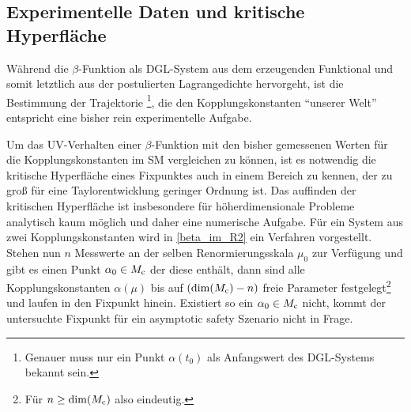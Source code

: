   \subsection{Experimentelle Daten und kritische Hyperfläche}
    Während die $\beta$-Funktion als DGL-System aus dem erzeugenden Funktional und somit letztlich 
    aus der postulierten Lagrangedichte hervorgeht, ist die Bestimmung der Trajektorie
    \footnote{Genauer muss nur ein Punkt $\alpha(t_0)$ als Anfangswert des DGL-Systems 
    bekannt sein.}, die 
    den Kopplungskonstanten "`unserer Welt"' entspricht eine bisher rein experimentelle Aufgabe. 
    
  
    Um das UV-Verhalten einer $\beta$-Funktion mit den bisher gemessenen Werten für die 
    Kopplungskonstanten im SM vergleichen zu können, ist es notwendig die kritische Hyperfläche 
    eines Fixpunktes auch in einem Bereich zu kennen, der zu groß für eine Taylorentwicklung 
    geringer Ordnung ist. Das auffinden der kritischen Hyperfläche ist insbesondere für 
    höherdimensionale Probleme analytisch kaum möglich und daher eine numerische Aufgabe. Für 
    ein System aus zwei Kopplungskonstanten wird in \ref{beta_im_R2} ein Verfahren 
    vorgestellt.
    Stehen nun $n$ Messwerte an der selben Renormierungsskala 
    $\mu_0$ zur Verfügung und gibt es einen Punkt $\alpha_0\in M_\text{c}$ der diese enthält, 
    dann sind alle Kopplungskonstanten $\alpha(\mu)$ bis auf $(\dim (M_\text{c})-n)$ freie Parameter 
    festgelegt\footnote{Für $n\geq \dim(M_\text{c})$ also eindeutig.} und laufen in den 
    Fixpunkt hinein. Existiert so ein $\alpha_0\in M_\text{c}$ nicht, kommt der untersuchte Fixpunkt 
    für ein asymptotic safety Szenario nicht in Frage. 

    

  
    



      


  
  
  
  
